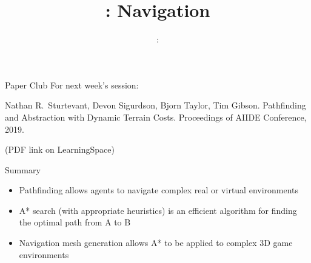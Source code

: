\usepackage{../../beamerthemeFalmouthGamesAcademy}
\usepackage{multimedia}
\graphicspath{ {../../} }


\usepackage[normalem]{ulem}
\usepackage{wasysym}

\usepackage{pdfpages}

\usetikzlibrary{arrows,automata}



\hypersetup{
pdftex,
pdftitle=\sessionnumber: Navigation,
pdfauthor=Ed Powley,
pdfdisplaydoctitle,
pdflang=en-GB
}


\title{\sessionnumber: Navigation}
\subtitle{\modulecode: \moduletitle}

\frame{\titlepage} 

\begin{frame}{Paper Club}
	For next week's session:
	
	Nathan R.\ Sturtevant, Devon Sigurdson, Bjorn Taylor, Tim Gibson.
	Pathfinding and Abstraction with Dynamic Terrain Costs.
	Proceedings of AIIDE Conference, 2019.
	
	(PDF link on LearningSpace)
\end{frame}




\begin{frame}{Summary}
	\begin{itemize}
		\pause\item Pathfinding allows agents to navigate complex real or virtual environments
		\pause\item A* search (with appropriate heuristics) is an efficient algorithm for finding the optimal path from A to B
		\pause\item Navigation mesh generation allows A* to be applied to complex 3D game environments
	\end{itemize}
\end{frame}


